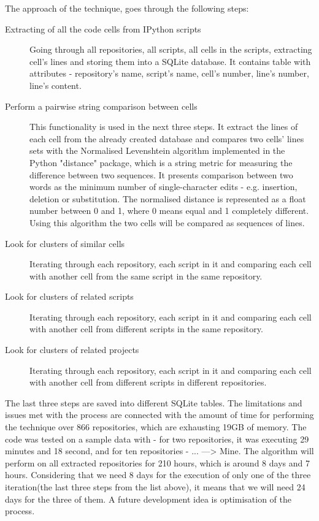 The approach of the technique, goes through the following steps: 

\begin{description}
\item [Extracting of all the code cells from IPython scripts] 

Going through all repositories, all scripts, all cells in the scripts, extracting cell's lines and storing them into a SQLite database\cite{sqlite3}. It contains table with attributes - repository's name, script's name, cell's number, line's number, line's content.

\item[Perform a pairwise string comparison between cells] 

This functionality is used in the next three steps. It extract the lines of each cell from the already created database and compares two cells' lines sets with the Normalised Levenshtein algorithm implemented in the Python "distance" package\cite{distance}, which is a string metric for measuring the difference between two sequences. It presents comparison between two words as the minimum number of single-character edits - e.g. insertion, deletion or substitution\cite{levenstein}. The normalised distance is represented as a float number between 0 and 1, where 0 means equal and 1 completely different. Using this algorithm the two cells will be compared as sequences of lines.

\item [Look for clusters of similar cells]

Iterating through each repository, each script in it and comparing each cell with another cell from the same script in the same repository. 

\item [Look for clusters of related scripts]

Iterating through each repository, each script in it and comparing each cell with another cell from different scripts in the same repository.

\item [Look for clusters of related projects] 

Iterating through each repository, each script in it and comparing each cell with another cell from different scripts in different repositories. 

\end{description}

The last three steps are saved into different SQLite\cite{sqlite3} tables. The limitations and issues met with the process are connected with the amount of time for performing the technique over 866 repositories, which are exhausting 19GB of memory. The code was tested on a sample data with - for two repositories, it was executing 29 minutes and 18 second, and for ten repositories - ... ---> Mine. The algorithm will perform on all extracted repositories for 210 hours, which is around 8 days and 7 hours. Considering that we need 8 days for the execution of only one of the three iteration(the last three steps from the list above), it means that we will need 24 days for the three of them. A future development idea is optimisation of the process. 


